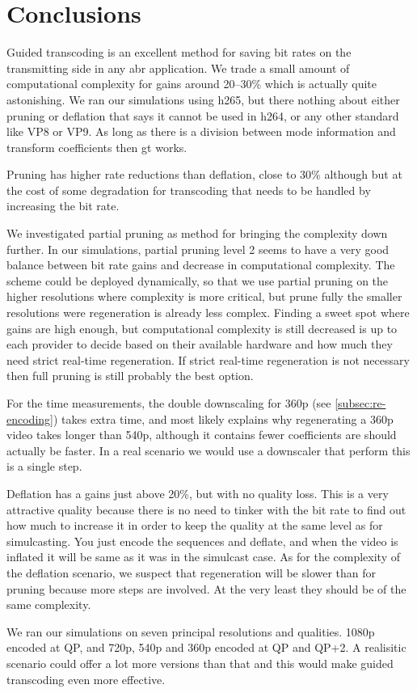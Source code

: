 \chapter{Conclusions}

Guided transcoding is an excellent method for saving bit rates on the transmitting side in any \gls{abr} application. We trade a small amount of computational complexity for gains around 20--30\% which is actually quite astonishing. We ran our simulations using \gls{h265}, but there nothing about either pruning or deflation that says it cannot be used in \gls{h264}, or any other standard like VP8 or VP9. As long as there is a division between mode information and transform coefficients then \gls{gt} works.

Pruning has higher rate reductions than deflation, close to 30\% although but at the cost of some degradation for transcoding that needs to be handled by increasing the bit rate.

We investigated partial pruning as method for bringing the complexity down further. In our simulations, partial pruning level 2 seems to have a very good balance between bit rate gains and decrease in computational complexity. The scheme could be deployed dynamically, so that we use partial pruning on the higher resolutions where complexity is more critical, but prune fully the smaller resolutions were regeneration is already less complex. Finding a sweet spot where gains are high enough, but computational complexity is still decreased is up to each provider to decide based on their available hardware and how much they need strict real-time regeneration.  If strict real-time regeneration is not necessary then full pruning is still probably the best option.

For the time measurements, the double downscaling for 360p (see \cref{subsec:re-encoding}) takes extra time, and most likely explains why regenerating a 360p video takes longer than 540p, although it contains fewer coefficients are should actually be faster. In a real scenario we would use a downscaler that perform this is a single step.

Deflation has a gains just above 20\%, but with no quality loss. This is a very attractive quality because there is no need to tinker with the bit rate to find out how much to increase it in order to keep the quality at the same level as for simulcasting. You just encode the sequences and deflate, and when the video is inflated it will be same as it was in the simulcast case. As for the complexity of the deflation scenario, we suspect that regeneration will be slower than for pruning because more steps are involved. At the very least they should be of the same complexity.

We ran our simulations on seven principal resolutions and qualities. 1080p encoded at QP, and 720p, 540p and 360p encoded at QP and QP+2. A realisitic scenario could offer a lot more versions than that and this would make guided transcoding even more effective.
